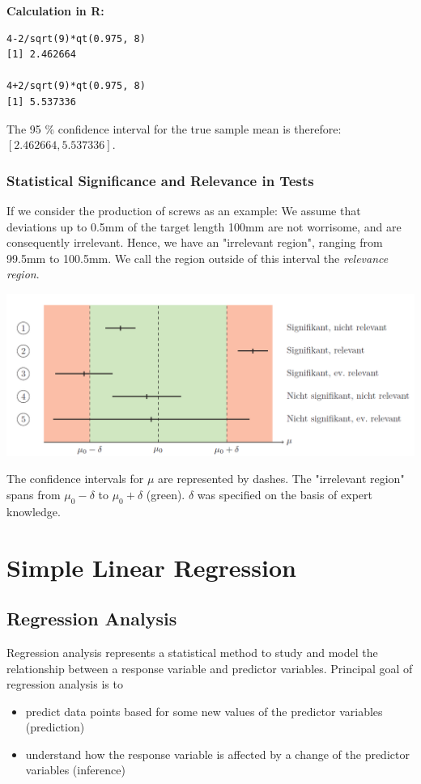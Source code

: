 \documentclass[11pt]{article}
\begin{document}
\newpage
\noindent
\textbf{Calculation in R:}
\begin{verbatim}
4-2/sqrt(9)*qt(0.975, 8)
[1] 2.462664

4+2/sqrt(9)*qt(0.975, 8)
[1] 5.537336
\end{verbatim}
The 95 \% confidence interval for the true sample mean is therefore: $\left[2.462664, 5.537336 \right]$.

\subsubsection{Statistical Significance and Relevance in Tests}
If we consider the production of screws as an example: We assume that deviations
up to 0.5mm of the target length 100mm are not worrisome, and are consequently
irrelevant. Hence, we have an "irrelevant region", ranging from 99.5mm to 100.5mm.
We call the region outside of this interval the \textit{relevance region}.


\begin{center}
	\includegraphics[width=0.95\linewidth]{img/statistical-relevance}
\end{center}
The confidence intervals for $\mu$ are represented by dashes. The "irrelevant region"
spans from $\mu_0 - \delta$ to $\mu_0 + \delta$ (green). $\delta$ was specified on the basis of expert knowledge.

\newpage
\section{Simple Linear Regression}
\subsection{Regression Analysis}
Regression analysis represents a statistical method to study and model the relationship between a response variable and predictor variables. Principal goal of regression analysis is to
\begin{itemize}[noitemsep]
	\item predict data points based for some new values of the predictor variables (prediction)
	\item understand how the response variable is affected by a change of the predictor variables (inference)
\end{itemize}
\end{document}
